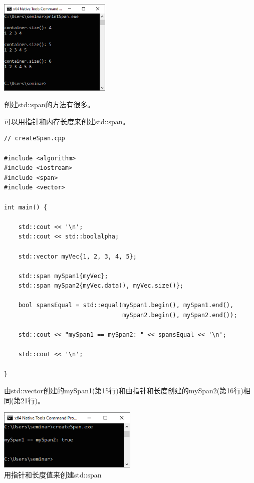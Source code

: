 \begin{center}
\includegraphics[width=0.4\textwidth]{content/3/chapter5/images/5.png}\\
\end{center}

创建std::span的方法有很多。


可以用指针和内存长度来创建std::span。

\begin{lstlisting}[style=styleCXX]
// createSpan.cpp

#include <algorithm>
#include <iostream>
#include <span>
#include <vector>

int main() {
	
	std::cout << '\n';
	std::cout << std::boolalpha;
	
	std::vector myVec{1, 2, 3, 4, 5};
	
	std::span mySpan1{myVec};
	std::span mySpan2{myVec.data(), myVec.size()};
	
	bool spansEqual = std::equal(mySpan1.begin(), mySpan1.end(),
	                             mySpan2.begin(), mySpan2.end());
	
	std::cout << "mySpan1 == mySpan2: " << spansEqual << '\n';
	
	std::cout << '\n';

}
\end{lstlisting}

由std::vector创建的mySpan1(第15行)和由指针和长度创建的mySpan2(第16行)相同(第21行)。

\begin{center}
\includegraphics[width=0.5\textwidth]{content/3/chapter5/images/6.png}\\
用指针和长度值来创建std::span
\end{center}


